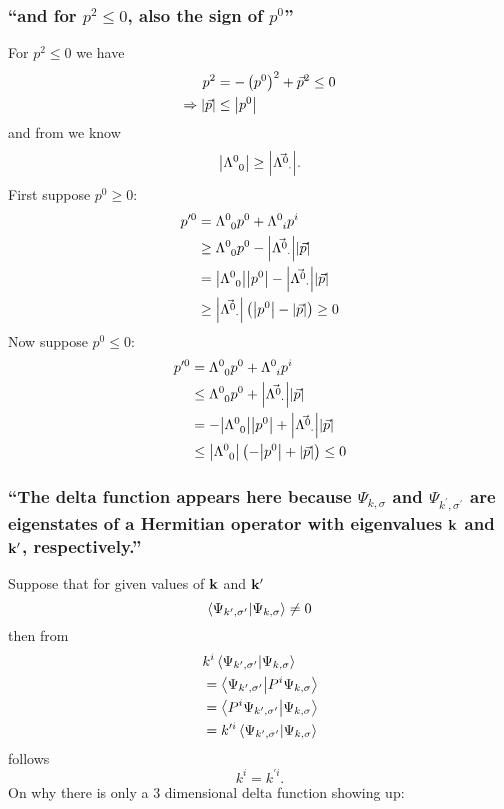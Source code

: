 \subsubsection{\enquote{and for $p^2\leq0$, also the sign of $p^0$} }
For $p^2\leq 0$ we have
\begin{align*} 
	p^2&=-\left(p^0\right)^2+\vec{p}^2\leq0\\
	\Rightarrow \abs{\vec{p}}&\leq \abs{p^0}
\end{align*}
and from  we know
\[\abs{\Lambda^0_{\hphantom{0}0}}\geq \abs{\vec{\Lambda^{0}_{\hphantom{0}\cdot}}}.\]
First suppose $p^0\geq0$:
\begin{align*} 
	p^{\prime 0}&=\Lambda^0_{\hphantom{0}0} p^0 +\Lambda^0_{\hphantom{0}i}p^i\\
	&\geq \Lambda^0_{\hphantom{0}0} p^0 - \abs{\vec{\Lambda^{0}_{\hphantom{0}\cdot}}} \abs{\vec{p}}\\
	&= \abs{\Lambda^0_{\hphantom{0}0}} \abs{p^0} - \abs{\vec{\Lambda^{0}_{\hphantom{0}\cdot}}} \abs{\vec{p}}\\
	&\geq \abs{\vec{\Lambda^{0}_{\hphantom{0}\cdot}}}\left( \abs{p^0}-\abs{\vec{p}}\right)\geq 0
\end{align*}
Now suppose $p^0\leq0$:
\begin{align*} 
	p^{\prime 0}&=\Lambda^0_{\hphantom{0}0} p^0 +\Lambda^0_{\hphantom{0}i}p^i\\
	&\leq \Lambda^0_{\hphantom{0}0} p^0 + \abs{\vec{\Lambda^{0}_{\hphantom{0}\cdot}}} \abs{\vec{p}}\\
	&= -\abs{\Lambda^0_{\hphantom{0}0}} \abs{p^0} + \abs{\vec{\Lambda^{0}_{\hphantom{0}\cdot}}} \abs{\vec{p}}\\
	&\leq \abs{\Lambda^0_{\hphantom{0}0}}\left( -\abs{p^0}+\abs{\vec{p}}\right)\leq 0
\end{align*}

\subsubsection{ \enquote{The delta function appears here because $\Psi_{k,\sigma}$ and $\Psi_{k^\prime,\sigma^\prime}$ are eigenstates of a Hermitian operator with eigenvalues $\mathbf{k}$ and $\mathbf{k}^\prime$, respectively.} }\label{sususec:2_5_p66_1}
Suppose that for given values of $\mathbf{k}$ and $\mathbf{k}^\prime$ \[\braket{\Psi_{k^\prime,\sigma^\prime}}{\Psi_{k,\sigma}}\neq 0\]
then from
\begin{align*} 
	&k^i\braket{\Psi_{k^\prime,\sigma^\prime}}{\Psi_{k,\sigma}}\\
	&=\braket{\Psi_{k^\prime,\sigma^\prime}}{P^i\Psi_{k,\sigma}}\\
	&=\braket{P^i\Psi_{k^\prime,\sigma^\prime}}{\Psi_{k,\sigma}}\\
	&=k^{\prime i}\braket{\Psi_{k^\prime,\sigma^\prime}}{\Psi_{k,\sigma}}
\end{align*}
follows \[k^i=k^{\prime i}.\]
On why there is only a 3 dimensional delta function showing up:


